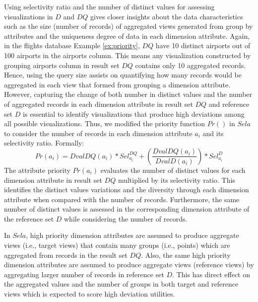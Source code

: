 Using selectivity ratio and the number of distinct values for assessing 
visualizations in $D$ and $DQ$ gives closer insights 
about the data characteristics such as the size (number of records) of aggregated views generated from 
group by attributes and the uniqueness degree of data in each dimension attribute.
%
%
%
Again, in the flights database Example \ref{ex:priority}, $DQ$ have 10 distinct airports out of 100 airports in the airports column.
%
This means any visualization constructed by grouping airports column in 
result set $DQ$ contains only 10 aggregated records. 
%
Hence, using the query size assists on quantifying how many records would be aggregated in each view 
that formed from grouping a dimension attribute. 
%
However, capturing the change of both number in distinct values and the number of aggregated records in each dimension attribute in result set $DQ$ and reference set $D$ is essential to identify visualizations that produce high deviations among all possible visualizations.
%
Thus, we modified the priority function $Pr()$ in $Sela$ to consider the number of records in each dimension attribute $a_i$ and its selectivity ratio. Formally:
%
\begin{equation}
\label{eq:prio_sela}
Pr(a_i) = Dval DQ(a_i) * Sel^{DQ}_{a_i} + (\frac{Dval DQ(a_i)}{Dval D(a_i)}) * Sel^{D}_{a_i}
\end{equation}
%
The attribute priority $Pr(a_i)$ evaluates the number of distinct values for each dimension attribute in result set $DQ$ multiplied by its selectivity ratio.
%
This identifies the distinct values variations and the diversity through each dimension attribute when compared with the number of records. 
%
Furthermore, the same number of distinct values is assessed in the corresponding dimension attribute of the reference set $D$ while considering the number of records.
  
In $Sela$, high priority dimension attributes are assumed to produce aggregate views (i.e., target views) that contain many groups (i.e., points) which are aggregated from records in the result set $DQ$. 
%
Also, the same high priority dimension attributes are assumed to produce aggregate views (reference views) 
by aggregating larger number of records in reference set $D$. 
%
This has direct effect on the aggregated values and the number of groups in both target and reference views which is expected to score high deviation utilities. 
%

